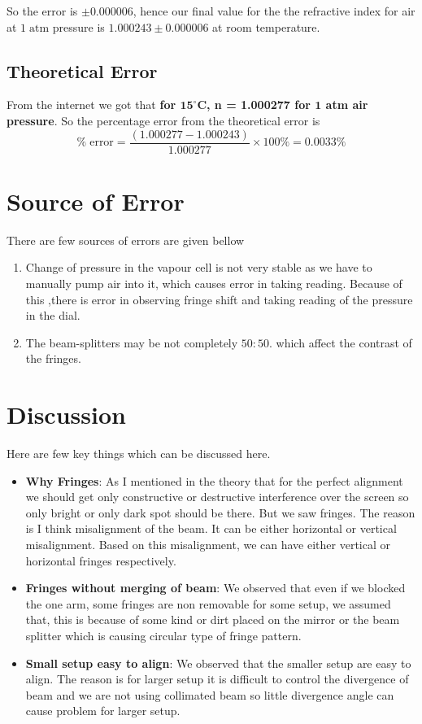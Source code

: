 So the error is $\pm 0.000006$, hence our final value for the the refractive index for air at $1 \; \text{atm}$ pressure is $1.000243 \pm 0.000006$ at room temperature.

\subsection{Theoretical Error}
From the internet we got that \textbf{for $\mathbf{15^{\circ}C}$, n = 1.000277 for $\mathbf{1}$ atm air pressure}. So the percentage error from the theoretical error is
\[
\% \; \text{error} = \frac{(1.000277 - 1.000243)}{1.000277} \times 100 \% = 0.0033 \%
\]
\section{Source of Error}
There are few sources of errors are given bellow
\begin{enumerate}
    \item Change of pressure in the vapour cell is not very stable as we have to manually pump air into it, which causes error in taking reading. Because of this ,there is error in observing fringe shift and taking reading of the pressure in the dial.
    \item The beam-splitters may be not completely $50:50$. which affect the contrast of the fringes.
\end{enumerate}
\section{Discussion}
Here are few key things which can be discussed here.
\begin{itemize}
    \item \textbf{Why Fringes}: As I mentioned in the theory that for the perfect alignment we should get only constructive or destructive interference over the screen so only bright or only dark spot should be there. But we saw fringes. The reason is I think misalignment of the beam. It can be either horizontal or vertical misalignment. Based on this misalignment, we can have either vertical or horizontal fringes respectively. 
    \item \textbf{Fringes without merging of beam}: We observed that even if we blocked the one arm, some fringes are non removable for some setup, we assumed that, this is because of some kind or dirt placed on the mirror or the beam splitter which is causing circular type of fringe pattern.
    \item \textbf{Small setup easy to align}: We observed that the smaller setup are easy to align. The reason is for larger setup it is difficult to control the divergence of beam and we are not using collimated beam so little divergence angle can cause problem for larger setup.  
\end{itemize}
